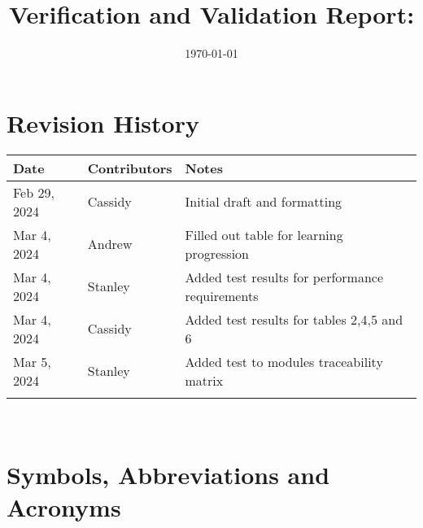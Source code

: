 \documentclass[12pt, titlepage]{article}
\begin{document}
\title{Verification and Validation Report: \progname} 
\author{\authname}
\date{\today}
	
\maketitle


\section{Revision History}

\begin{tabularx}{\textwidth}{p{3cm}p{3cm}X}
\toprule {\bf Date} & {\bf Contributors} & {\bf Notes}\\
\midrule
Feb 29, 2024 & Cassidy & Initial draft and formatting\\
Mar 4, 2024 & Andrew & Filled out table for learning progression\\
Mar 4, 2024 & Stanley & Added test results for performance requirements\\
Mar 4, 2024 & Cassidy & Added test results for tables 2,4,5 and 6\\
Mar 5, 2024 & Stanley & Added test to modules traceability matrix\\
 &  & \\
\bottomrule
\end{tabularx}

~\newpage

\section{Symbols, Abbreviations and Acronyms}
\end{document}
